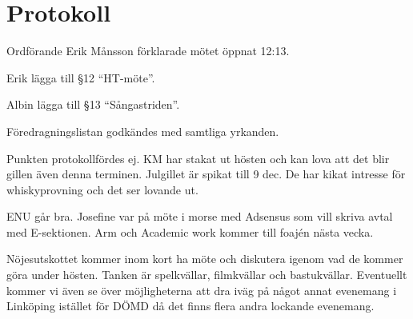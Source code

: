 \documentclass[10pt]{article}
\def\mo{Erik Månsson}
\begin{document}
\section*{Protokoll}
\begin{paragrafer}
Ordförande {\mo} förklarade mötet öppnat 12:13.

{\valavmo}

{\valavms}

{\valavj}

{\tosg}

{\ingaadj}


Erik \ypa lägga till \S12 ``HT-möte''.

Albin \ypa lägga till \S13 ``Sångastriden''.

Föredragningslistan godkändes med samtliga yrkanden.

\begin{fyllnadsval} %

\end{fyllnadsval}

\begin{paragrafer}
Punkten protokollfördes ej.
KM har stakat ut hösten och kan lova att det blir gillen även denna terminen. Julgillet är spikat till 9 dec. De har kikat intresse för whiskyprovning och det ser lovande ut.

ENU går bra. Josefine var på möte i morse med Adsensus som vill skriva avtal med E-sektionen. Arm och Academic work kommer till foajén nästa vecka.

Nöjesutskottet kommer inom kort ha möte och diskutera igenom vad de kommer göra under hösten. Tanken är spelkvällar, filmkvällar och bastukvällar. Eventuellt kommer vi även se över möjligheterna att dra iväg på något annat evenemang i Linköping istället för DÖMD då det finns flera andra lockande evenemang.


\end{paragrafer}
\end{paragrafer}
\end{document}

